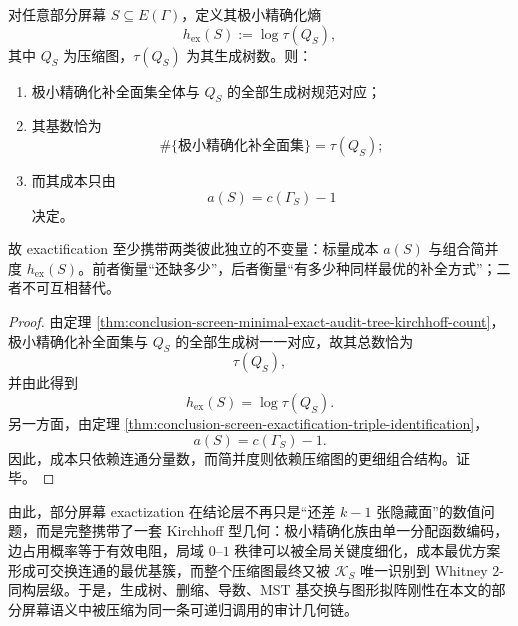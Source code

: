 \begin{theorem}\label{thm:conclusion-screen-exactification-cost-degeneracy-bifurcation}
对任意部分屏幕 \(S\subseteq E(\Gamma)\)，定义其极小精确化熵
\[
h_{\mathrm{ex}}(S):=\log \tau(Q_S),
\]
其中 \(Q_S\) 为压缩图，\(\tau(Q_S)\) 为其生成树数。则：
\begin{enumerate}
  \item 极小精确化补全面集全体与 \(Q_S\) 的全部生成树规范对应；
  \item 其基数恰为
        \[
        \#\{\text{极小精确化补全面集}\}=\tau(Q_S);
        \]
  \item 而其成本只由
        \[
        a(S)=c(\Gamma_S)-1
        \]
        决定。
\end{enumerate}
故 exactification 至少携带两类彼此独立的不变量：标量成本 \(a(S)\) 与组合简并度 \(h_{\mathrm{ex}}(S)\)。前者衡量“还缺多少”，后者衡量“有多少种同样最优的补全方式”；二者不可互相替代。
\end{theorem}
\begin{proof}
由定理 \ref{thm:conclusion-screen-minimal-exact-audit-tree-kirchhoff-count}，极小精确化补全面集与 \(Q_S\) 的全部生成树一一对应，故其总数恰为
\[
\tau(Q_S),
\]
并由此得到
\[
h_{\mathrm{ex}}(S)=\log \tau(Q_S).
\]
另一方面，由定理 \ref{thm:conclusion-screen-exactification-triple-identification}，
\[
a(S)=c(\Gamma_S)-1.
\]
因此，成本只依赖连通分量数，而简并度则依赖压缩图的更细组合结构。证毕。
\end{proof}

\noindent
由此，部分屏幕 exactization 在结论层不再只是“还差 \(k-1\) 张隐藏面”的数值问题，而是完整携带了一套 Kirchhoff 型几何：极小精确化族由单一分配函数编码，边占用概率等于有效电阻，局域 \(0\text{--}1\) 秩律可以被全局关键度细化，成本最优方案形成可交换连通的最优基簇，而整个压缩图最终又被 \(\mathcal K_S\) 唯一识别到 Whitney \(2\)-同构层级。于是，生成树、删缩、导数、MST 基交换与图形拟阵刚性在本文的部分屏幕语义中被压缩为同一条可递归调用的审计几何链。

\endinput
